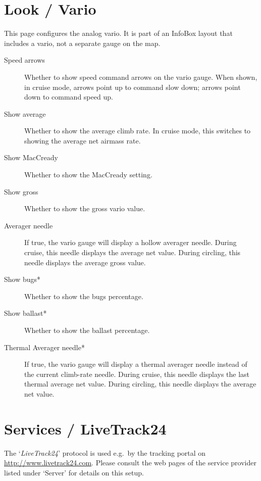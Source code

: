 \section{Look / Vario}\label{sec:vario-gauge}

This page configures the analog vario. It is part of an InfoBox layout
that includes a vario, not a separate gauge on the map.

\begin{description}
\item[Speed arrows]  \label{conf:variogauge} Whether to show speed command
  arrows on the vario gauge.
  When shown, in cruise mode, arrows point up to command slow down; arrows point down
  to command speed up.
\item[Show average]  Whether to show the average climb rate.  In cruise mode, this
  switches to showing the average net airmass rate.
\item[Show MacCready]  Whether to show the MacCready setting.
\item[Show gross]  Whether to show the gross vario value.
\item[Averager needle]  If true, the vario gauge will display a hollow averager
  needle. During cruise, this needle displays the average net value. During circling,
  this needle displays the average gross value.
\item[Show bugs*]  Whether to show the bugs percentage.
\item[Show ballast*]  Whether to show the ballast percentage.
\item[Thermal Averager needle*]  If true, the vario gauge will display a thermal
  averager needle instead of the current climb-rate needle. During cruise, this
  needle displays the last thermal average net value. During circling, this
  needle displays the average net value.
\end{description}


\section{Services / LiveTrack24}

The `{\em LiveTrack24}' protocol is used e.g.\ by the tracking portal on
\url{http://www.livetrack24.com}.
Please consult the web pages of the service provider listed under `Server'
for details on this setup.

